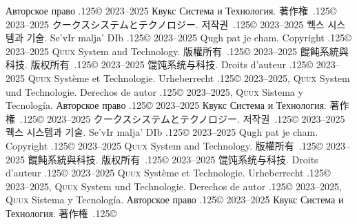 \documentclass{cookbook}
\begin{document}
{{{\foreignlanguage{russian}{Авторское право} %
	{\lower.125\baselineskip\hbox{\copyright}}
	2023–2025 \foreignlanguage{russian}{Квукс Система и Технология.}
著作権~{\lower.125\baselineskip\hbox{\copyright}}
	2023--2025 クークスシステムとテクノロジー.
저작권~{\lower.125\baselineskip\hbox{\copyright}}
	2023--2025 퀙스 시스템과 기술.
Se'vIr malja' DIb {\lower.125\baselineskip\hbox{\copyright}} %
	2023--2025 Qugh pat je cham.
\texttt{{\gitabbrcommithash}}
Copyright {\lower.125\baselineskip\hbox{\copyright}}
	2023--2025 \textsc{Quux} System and Technology.
版權所有~{\lower.125\baselineskip\hbox{\copyright}}
	2023--2025 餛飩系統與科技.
版权所有~{\lower.125\baselineskip\hbox{\copyright}}
	2023--2025 馄饨系统与科技.
Droits d'auteur {\lower.125\baselineskip\hbox{\copyright}} %
	2023--2025 \textsc{Quux} Système et Technologie.
Urheberrecht {\lower.125\baselineskip\hbox{\copyright}} %
	2023--2025, \textsc{Quux} System und Technologie.
Derechos de autor {\lower.125\baselineskip\hbox{\copyright}} %
	2023--2025, \textsc{Quux} Sistema y Tecnología.
\foreignlanguage{russian}{Авторское право} %
	{\lower.125\baselineskip\hbox{\copyright}}
	2023–2025 \foreignlanguage{russian}{Квукс Система и Технология.}
著作権~{\lower.125\baselineskip\hbox{\copyright}}
	2023--2025 クークスシステムとテクノロジー.
저작권~{\lower.125\baselineskip\hbox{\copyright}}
	2023--2025 퀙스 시스템과 기술.
Se'vIr malja' DIb {\lower.125\baselineskip\hbox{\copyright}} %
	2023--2025 Qugh pat je cham.
\texttt{{\gitabbrcommithash}}
Copyright {\lower.125\baselineskip\hbox{\copyright}}
	2023--2025 \textsc{Quux} System and Technology.
版權所有~{\lower.125\baselineskip\hbox{\copyright}}
	2023--2025 餛飩系統與科技.
版权所有~{\lower.125\baselineskip\hbox{\copyright}}
	2023--2025 馄饨系统与科技.
Droits d'auteur {\lower.125\baselineskip\hbox{\copyright}} %
	2023--2025 \textsc{Quux} Système et Technologie.
Urheberrecht {\lower.125\baselineskip\hbox{\copyright}} %
	2023--2025, \textsc{Quux} System und Technologie.
Derechos de autor {\lower.125\baselineskip\hbox{\copyright}} %
	2023--2025, \textsc{Quux} Sistema y Tecnología.
\foreignlanguage{russian}{Авторское право} %
	{\lower.125\baselineskip\hbox{\copyright}}
	2023–2025 \foreignlanguage{russian}{Квукс Система и Технология.}
著作権~{\lower.125\baselineskip\hbox{\copyright}}
}}}
\end{document}

